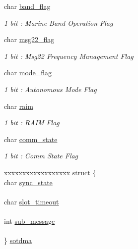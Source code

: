 \begin{DoxyCompactItemize}
char \mbox{\hyperlink{structaismsg__18_ab0cfca849d733ab353d842ea47f17ed2}{band\+\_\+flag}}
\begin{DoxyCompactList}\small\item\em 1 bit \+: Marine Band Operation Flag \end{DoxyCompactList}\item 
char \mbox{\hyperlink{structaismsg__18_abd59606240292c28f726789e128dd33b}{msg22\+\_\+flag}}
\begin{DoxyCompactList}\small\item\em 1 bit \+: Msg22 Frequency Management Flag \end{DoxyCompactList}\item 
char \mbox{\hyperlink{structaismsg__18_ae90af08ed731e396b88dae0745c76654}{mode\+\_\+flag}}
\begin{DoxyCompactList}\small\item\em 1 bit \+: Autonomous Mode Flag \end{DoxyCompactList}\item 
char \mbox{\hyperlink{structaismsg__18_a13d9655d60d11cd8a957c7b911c97233}{raim}}
\begin{DoxyCompactList}\small\item\em 1 bit \+: R\+A\+IM Flag \end{DoxyCompactList}\item 
char \mbox{\hyperlink{structaismsg__18_af65915c5c7cea0815105384f3e858403}{comm\+\_\+state}}
\begin{DoxyCompactList}\small\item\em 1 bit \+: Comm State Flag \end{DoxyCompactList}\item 
\begin{tabbing}
xx\=xx\=xx\=xx\=xx\=xx\=xx\=xx\=xx\=\kill
struct \{\\
\>char \mbox{\hyperlink{structaismsg__18_a4a94651585d0b788d0151005f241dabc}{sync\_state}}\\
\>\\
\>char \mbox{\hyperlink{structaismsg__18_acc10a293afb3ad79c34bbe3ef0592dfc}{slot\_timeout}}\\
\>\\
\>int \mbox{\hyperlink{structaismsg__18_ab3fe58dd1f294c9481c8e050841999d5}{sub\_message}}\\
\>\\
\} \mbox{\hyperlink{structaismsg__18_a7303c9b1e6d733279a5cd44aa47dd220}{sotdma}}\\


\end{tabbing}
\end{DoxyCompactItemize}
